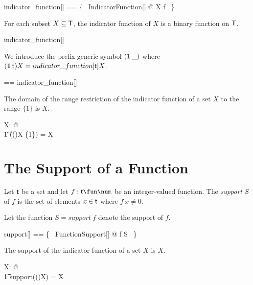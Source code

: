 \documentclass{amsart}
\begin{document}
\begin{zed}
	indicator\_function[\genT] == \{~ IndicatorFunction[\genT] @ X \mapsto f ~\}
\end{zed}

\begin{remark}
For each subset $X \subseteq \mathsf{T}$, the indicator function of $X$ is a binary function on $\mathsf{T}$.
\begin{zed}
	indicator\_function[\setT] \in \power \setT \fun \setT \fun \B
\end{zed}
\end{remark}

We introduce the prefix generic symbol $(\operatorname{\mathbf{1}} \_)$ where $(\operatorname{\mathbf{1}} \mathsf{t})X = indicator\_function[\mathsf{t}] X$.

\begin{zed}
	\indF \genT == indicator\_function[\genT]
\end{zed}

\begin{remark}
The domain of the range restriction of the indicator function of a set $X$ to the range $\{1\}$ is $X$.
\begin{zed}
	\forall X: \power \setT @ \\
	\t1	\dom((\indF \setT)X \rres \{1\}) = X
\end{zed}
\end{remark}

\section{The Support of a Function}

Let $\mathsf{t}$ be a set and let $f: \genT \fun \num$ be an integer-valued function.
The \textit{support} $S$ of $f$ is the set of elements $x \in \mathsf{t}$ where $f~x \neq 0$.


Let the function $S = support~f$ denote the support of $f$.

\begin{zed}
	support[\genT] == \{~ FunctionSupport[\genT] @ f \mapsto S ~\}
\end{zed}

\begin{example}
The support of the indicator function of a set $X$ is $X$.
\begin{zed}
	\forall X: \power \setT @ \\
	\t1 support((\indF \setT)X) = X
\end{zed}
\end{example}
\end{document}
